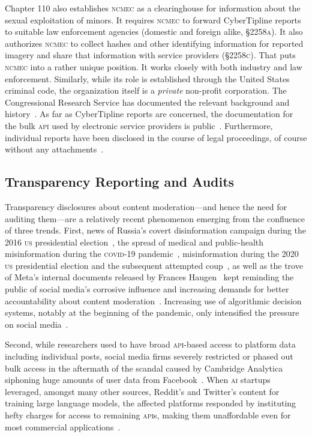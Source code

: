 \documentclass[nonacm,screen]{acmart}
\newcommand\V[1]{\textsc{\MakeLowercase{#1}}}
\begin{document}
Chapter 110 also establishes \V{NCMEC} as a clearinghouse for information about
the sexual exploitation of minors. It requires \V{NCMEC} to forward CyberTipline
reports to suitable law enforcement agencies (domestic and foreign alike,
\V{\S2258A}). It also authorizes \V{NCMEC} to collect hashes and other
identifying information for reported imagery and share that information with
service providers (\V{\S2258C}). That puts \V{NCMEC} into a rather unique
position. It works closely with both industry and law enforcement. Similarly,
while its role is established through the United States criminal code, the
organization itself is a \emph{private} non-profit corporation. The
Congressional Research Service has documented the relevant background and
history~\cite{FernandesAlcantaraHanson2021}. As far as CyberTipline reports are
concerned, the documentation for the bulk \V{API} used by electronic service
providers is public~\cite{NCMEC2024}. Furthermore, individual reports have been
disclosed in the course of legal proceedings, of course without any
attachments~\cite{NationalCenterForMissingAndExploitedChildren2017,
NationalCenterForMissingAndExploitedChildren2017a}.


\subsection{Transparency Reporting and Audits}

Transparency disclosures about content moderation---and hence the need for
auditing them---are a relatively recent phenomenon emerging from the confluence
of three trends. First, news of Russia's covert disinformation campaign during
the 2016 \V{US} presidential election~\cite{Francoisdouek2021}, the spread of
medical and public-health misinformation during the \V{COVID-19}
pandemic~\cite{ChoLiea2023,FoleyGurakar2022,GreenhalghOzbilginea2022},
misinformation during the 2020 \V{US} presidential election and the subsequent
attempted coup~\cite{JacksonConroyea2023,SilvermanTimbergea2022}, as well as the
trove of Meta's internal documents released by Frances
Haugen~\cite{CameronWodinskyea2023, ElliottChristopherea2021} kept reminding the
public of social media's corrosive influence and increasing demands for better
accountability about content
moderation~\cite{HaimsonDelmonacoea2021,KozyrevaHerzogea2023}. Increasing use of
algorithmic decision systems, notably at the beginning of the pandemic, only
intensified the pressure on social media~\cite{ScottKayali2020}.

Second, while researchers used to have broad \V{API}-based access to platform
data including individual posts, social media firms severely restricted or
phased out bulk access in the aftermath of the scandal caused by Cambridge
Analytica siphoning huge amounts of user data from
Facebook~\cite{Bruns2019,Puschmann2019,WalkerMerceaea2019}. When \V{AI} startups
leveraged, amongst many other sources, Reddit's and Twitter's content for
training large language models, the affected platforms responded by instituting
hefty charges for access to remaining \V{API}s, making them unaffordable even
for most commercial applications~\cite{Isaac2023}.
\end{document}
